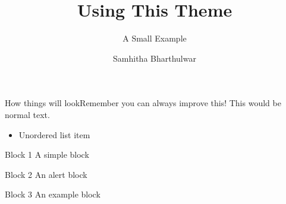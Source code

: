 \documentclass{beamer}
\title{Using This Theme}
\subtitle{A Small Example}
\author{Samhitha Bharthulwar}
\date{}
\begin{document}
\begin{frame}
\titlepage
\end{frame}

\begin{frame}{How things will look}{Remember you can always improve this!}
    This would be normal text.
    \begin{itemize}
        \item Unordered list item
    \end{itemize}
    
    \begin{block}{Block 1}
    A simple block
    \end{block}
    
    \begin{alertblock}{Block 2}
    An alert block
    \end{alertblock}
    
    \begin{exampleblock}{Block 3}
    An example block
    \end{exampleblock}
\end{frame}
\end{document}
